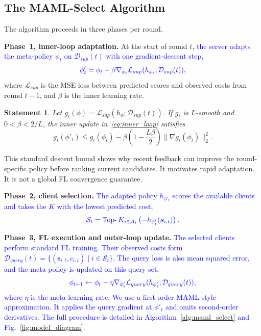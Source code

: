 \documentclass[journal]{IEEEtran}
\newtheorem{Statement}{Statement}
\newcommand{\revision}[1]{\textcolor{blue}{#1}}
\begin{document}
\subsection{The MAML-Select Algorithm}
The algorithm proceeds in three phases per round.

\textbf{Phase~1, inner-loop adaptation.}
At the start of round $t$, \revision{the server adapts the meta-policy $\phi_t$ on $\mathcal{D}_{sup}(t)$ with one gradient-descent step,}
\begin{equation}
	\color{blue}
		\phi'_t = \phi_t - \beta \nabla_{\phi_t} \mathcal{L}_{sup}(h_{\phi_t};\mathcal{D}_{sup}(t)),
		\label{eq:inner_loop}
\end{equation}
where $\mathcal{L}_{sup}$ is the MSE loss between predicted scores and observed costs from round $t-1$, and $\beta$ is the inner learning rate.

{\color{blue}
\begin{Statement}
Let $g_t(\phi)=\mathcal{L}_{sup}(h_\phi;\mathcal{D}_{sup}(t))$. If $g_t$ is $L$-smooth and $0<\beta<2/L$, the inner update in~\eqref{eq:inner_loop} satisfies
\[
g_t(\phi'_t) \leq g_t(\phi_t)
-\beta\left(1-\frac{L\beta}{2}\right)
\|\nabla g_t(\phi_t)\|_2^2.
\]
\end{Statement}
This standard descent bound shows why recent feedback can improve the round-specific policy before ranking current candidates. It motivates rapid adaptation. It is not a global FL convergence guarantee.
}

\textbf{Phase~2, client selection.}
\revision{The adapted policy $h_{\phi'_t}$ scores the available clients and takes the $K$ with the lowest predicted cost,}
\begin{equation}
	\color{blue}
	\mathcal{S}_t = \operatorname{Top-}K_{i \in \mathcal{A}_t} \left( -h_{\phi'_t}(\bm{s}_{i,t}) \right).
	\label{eq:selection}
\end{equation}

\textbf{Phase~3, FL execution and outer-loop update.}
\revision{The selected clients perform standard FL training. Their observed costs form $\mathcal{D}_{query}(t)=\{(\bm{s}_{i,t},c_{i,t})\mid i\in\mathcal{S}_t\}$. The query loss is also mean squared error, and the meta-policy is updated on this query set,}
\begin{equation}
		\color{blue}
		\phi_{t+1} \leftarrow \phi_t - \eta \nabla_{\phi'_t} \mathcal{L}_{query}(h_{\phi'_t}; \mathcal{D}_{query}(t)),
		\label{eq:outer_loop}
\end{equation}
\revision{where $\eta$ is the meta-learning rate. We use a first-order MAML-style approximation. It applies the query gradient at $\phi'_t$ and omits second-order derivatives. The full procedure is detailed in Algorithm~\ref{alg:maml_select} and Fig.~\ref{fig:model_diagram}.}
\end{document}
